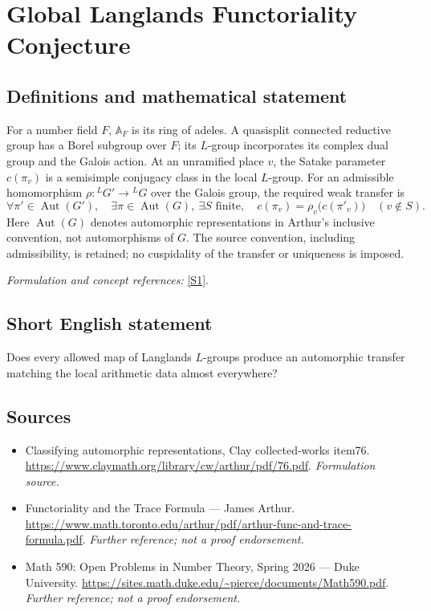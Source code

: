 \documentclass[11pt]{article}
\begin{document}
\section*{\texorpdfstring{Global Langlands Functoriality Conjecture}{Global Langlands Functoriality Conjecture}}\label{7}
\subsection{Definitions and mathematical statement}
For a number field $F$, ${\mathbb{A}}_F$ is its ring of adeles. A quasisplit connected reductive group has a Borel subgroup over $F$; its $L$-group incorporates its complex dual group and the Galois action. At an unramified place $v$, the Satake parameter $c(\pi_v)$ is a semisimple conjugacy class in the local $L$-group. For an admissible homomorphism $\rho:{}^LG'\to{}^LG$ over the Galois group, the required weak transfer is
\[
 \forall\pi'\in\operatorname{Aut}(G'),\quad \exists\pi\in\operatorname{Aut}(G),\ \exists S\text{ finite},\quad
 c(\pi_v)=\rho_v\bigl(c(\pi'_v)\bigr)\quad(v\notin S).
\]
Here $\operatorname{Aut}(G)$ denotes automorphic representations in Arthur's inclusive convention, not automorphisms of $G$. The source convention, including admissibility, is retained; no cuspidality of the transfer or uniqueness is imposed.
\par\smallskip\textit{Formulation and concept references:} \href{https://www.claymath.org/library/cw/arthur/pdf/76.pdf}{[S1]}.

\subsection{Short English statement}
Does every allowed map of Langlands $L$-groups produce an automorphic transfer matching the local arithmetic data almost everywhere?
\subsection{Sources}
\begin{itemize}
\item[S1]Classifying automorphic representations, Clay collected-works item76.
\url{https://www.claymath.org/library/cw/arthur/pdf/76.pdf}.
\textit{Formulation source.}
\item[S2]Functoriality and the Trace Formula — James Arthur.
\url{https://www.math.toronto.edu/arthur/pdf/arthur-func-and-trace-formula.pdf}.
\textit{Further reference; not a proof endorsement.}
\item[S3]Math 590: Open Problems in Number Theory, Spring 2026 — Duke University.
\url{https://sites.math.duke.edu/~pierce/documents/Math590.pdf}.
\textit{Further reference; not a proof endorsement.}
\end{itemize}
\end{document}
